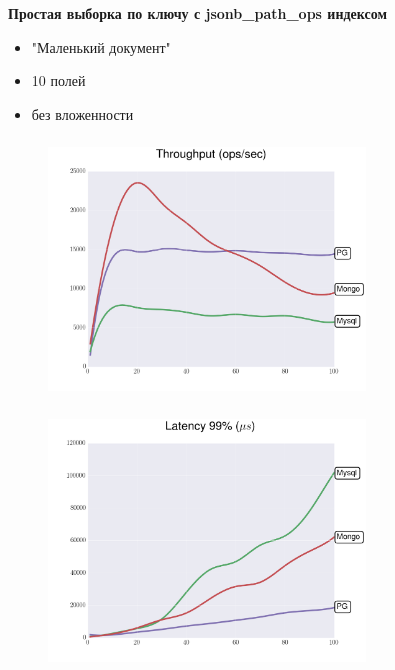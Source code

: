 \documentclass[usenames,dvipsnames, 18pt, compress, aspectratio=169]{beamer}
\begin{document}
\begin{frame}
    \frametitle{}
    \begin{center}
        \textbf{Простая выборка по ключу с jsonb\_path\_ops индексом}
        \begin{itemize}[label={}]
            \item "Маленький документ"
            \item 10 полей
            \item без вложенности
        \end{itemize}
    \end{center}
\end{frame}

\begin{frame}
    \frametitle{}
    \begin{center}
    \begin{figure}
        \includegraphics[width=0.75\textwidth,center]{benchmarks/workload_c_jsonb_path_ops/throughput.png}
    \end{figure}
    \end{center}
\end{frame}

\begin{frame}
    \frametitle{}
    \begin{center}
    \begin{figure}
        \includegraphics[width=0.75\textwidth,center]{benchmarks/workload_c_jsonb_path_ops/latency_99.png}
    \end{figure}
    \end{center}
\end{frame}
\end{document}
